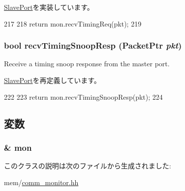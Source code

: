 \hyperlink{classSlavePort_abcece77e42f88ee41af8d3d01bb48253}{SlavePort}を実装しています。


\begin{DoxyCode}
217         {
218             return mon.recvTimingReq(pkt);
219         }
\end{DoxyCode}
\hypertarget{classCommMonitor_1_1MonitorSlavePort_a9b643d565edc21dac11ce15a560238a7}{
\subsubsection[{recvTimingSnoopResp}]{\setlength{\rightskip}{0pt plus 5cm}bool recvTimingSnoopResp ({\bf PacketPtr} {\em pkt})}}
\label{classCommMonitor_1_1MonitorSlavePort_a9b643d565edc21dac11ce15a560238a7}
Receive a timing snoop response from the master port. 

\hyperlink{classSlavePort_ae808ca0180bf333d9072270ed66f17fe}{SlavePort}を再定義しています。


\begin{DoxyCode}
222         {
223             return mon.recvTimingSnoopResp(pkt);
224         }
\end{DoxyCode}


\subsection{変数}
\hypertarget{classCommMonitor_1_1MonitorSlavePort_ab6833d8d55cb403502472c073464905b}{
\subsubsection[{mon}]{\& {\bf mon}}}
\label{classCommMonitor_1_1MonitorSlavePort_ab6833d8d55cb403502472c073464905b}


このクラスの説明は次のファイルから生成されました:\begin{DoxyCompactItemize}
\item 
mem/\hyperlink{comm__monitor_8hh}{comm\_\-monitor.hh}\end{DoxyCompactItemize}
